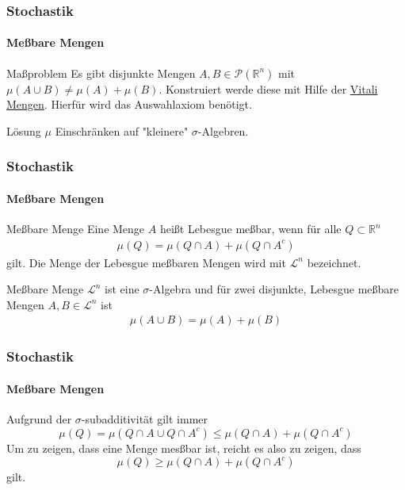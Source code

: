 \documentclass{beamer}
\begin{document}
\begin{frame}
    \frametitle{Stochastik}
\framesubtitle{Meßbare Mengen}
    \begin{block}{Maßproblem}
Es gibt disjunkte Mengen  $A,B \in \mathcal{P}(\mathbb{R}^n)$ mit $\mu(A \cup B) \neq \mu(A) + \mu(B)$. Konstruiert werde diese mit Hilfe der 
\href{https://www.youtube.com/watch?v=SJ8YoV6YZFA}{Vitali Mengen}. Hierfür wird das Auswahlaxiom benötigt.
\end{block}

    \begin{block}{Lösung}
$\mu$ Einschränken auf "kleinere" $\sigma$-Algebren.
\end{block}

 \end{frame}


\begin{frame}
    \frametitle{Stochastik}
\framesubtitle{Meßbare Mengen}
    \begin{block}{Meßbare Menge}
Eine Menge $A$ heißt Lebesgue meßbar, wenn für alle $Q \subset \mathbb{R}^n$
\begin{align*}
\mu(Q) = \mu(Q \cap A) + \mu(Q \cap A^c)  
\end{align*}
gilt. Die Menge der Lebesgue meßbaren Mengen wird mit $\mathcal{L}^n$ bezeichnet.
\end{block}


    \begin{block}{Meßbare Menge}
$\mathcal{L}^n$ ist eine $\sigma$-Algebra und für  zwei disjunkte, Lebesgue meßbare Mengen  $A,B \in \mathcal{L}^n$ ist
\begin{align*}
 \mu(A \cup B) = \mu(A) + \mu(B)
\end{align*}

\end{block}

 \end{frame}


 \begin{frame}
    \frametitle{Stochastik}
\framesubtitle{Meßbare Mengen}
Aufgrund der $\sigma$-subadditivität gilt immer
$$ \mu(Q) = \mu(Q \cap A \cup Q \cap A^c) \leq \mu(Q \cap A) +  \mu(Q \cap A^c) $$
Um zu zeigen, dass eine Menge mesßbar ist, reicht es also zu zeigen, dass 
$$\mu(Q)  \geq \mu(Q \cap A) +  \mu(Q \cap A^c) $$
gilt.
\end{frame}
\end{document}
